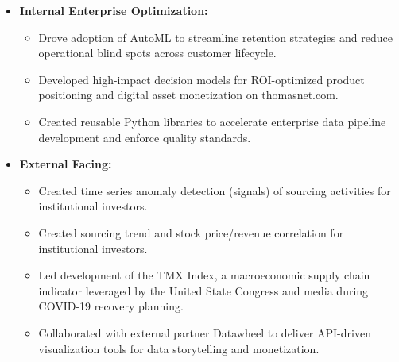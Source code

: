 \documentclass[12pt,a4paper,sans]{moderncv}
\begin{document}
\begin{itemize}
\item \textbf{Internal Enterprise Optimization:}
  \begin{itemize}
    \item Drove adoption of AutoML to streamline retention strategies and reduce operational blind spots across customer lifecycle.
    \item Developed high-impact decision models for ROI-optimized product positioning and digital asset monetization on thomasnet.com.
    \item Created reusable Python libraries to accelerate enterprise data pipeline development and enforce quality standards.
  \end{itemize}
\item \textbf{External Facing:}
  \begin{itemize}
     \item Created time series anomaly detection (signals) of sourcing activities for institutional investors.
    \item Created sourcing trend and stock price/revenue correlation for institutional investors.
    \item Led development of the TMX Index, a macroeconomic supply chain indicator leveraged by the United State Congress and media during COVID-19 recovery planning.
    \item Collaborated with external partner Datawheel to deliver API-driven visualization tools for data storytelling and monetization.
  \end{itemize}
\end{itemize}

\bigskip
\end{document}
